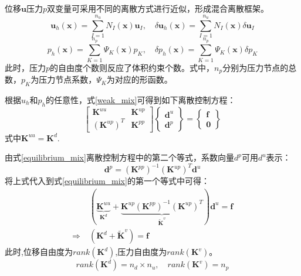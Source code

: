 位移$\boldsymbol u$压力$p$双变量可采用不同的离散方式进行近似，形成混合离散框架。
\begin{equation}\label{u_h_mix}
    \boldsymbol u_h(\boldsymbol x) = \sum_{I=1}^{n_u} N_I(\boldsymbol x) \boldsymbol u_I, \quad
    \delta \boldsymbol u_h(\boldsymbol x) = \sum_{I=1}^{n_u} N_I(\boldsymbol x) \delta \boldsymbol u_I
\end{equation}
\begin{equation}\label{p_h_mix}
    p_h(\boldsymbol x) = \sum_{K=1}^{n_p} \Psi_K(\boldsymbol x) p_K, \quad
    \delta p_h(\boldsymbol x) = \sum_{K=1}^{n_p} \Psi_K(\boldsymbol x) \delta p_K
\end{equation}
此时，压力$p$的自由度个数则反应了体积约束个数。式中，$n_p$分别为压力节点的总数，$p_K$为压力节点系数，$\Psi_K$为对应的形函数。

根据$u_h$和$p_h$的任意性，式\eqref{weak_mix}可得到如下离散控制方程：
\begin{equation}\label{equilibrium_mix}
    \begin{bmatrix}
        \boldsymbol K^{uu} & \boldsymbol K^{up} \\ (\boldsymbol K^{up})^T & \boldsymbol K^{pp}
    \end{bmatrix}
    \begin{Bmatrix}
        \boldsymbol d^u \\ \boldsymbol d^p 
    \end{Bmatrix} =
    \begin{Bmatrix}
        \boldsymbol f \\ \boldsymbol 0 
    \end{Bmatrix}
\end{equation}
式中$\boldsymbol K^{uu} = \boldsymbol K^d$. 

由式\eqref{equilibrium_mix}离散控制方程中的第二个等式，系数向量$d^p$可用$d^u$表示：
\begin{equation}
    \boldsymbol d^p = (\boldsymbol K^{pp})^{-1} (\boldsymbol K^{up})^T \boldsymbol d^u
\end{equation}
将上式代入到式\eqref{equilibrium_mix}的第一个等式中可得：
\begin{equation}\label{equilibrium_projection}
    \begin{split}
        &(\underbrace{\boldsymbol K^{uu}}_{\boldsymbol K^d} +  \underbrace{\boldsymbol K^{up}(\boldsymbol K^{pp})^{-1}(\boldsymbol K^{up})^{T}}_{\tilde{\boldsymbol K}^v}) \boldsymbol d^u = \boldsymbol f \\
        \Rightarrow\;& (\boldsymbol K^d + \tilde{\boldsymbol K}^v) = \boldsymbol f
    \end{split}
\end{equation}
此时,位移自由度为$rank(\boldsymbol K^d)$,压力自由度为$rank(\boldsymbol K^v)$。
\begin{equation}
    rank(\boldsymbol K^d)=n_d\times n_u,\quad rank(\boldsymbol K^v)=n_p
\end{equation}

